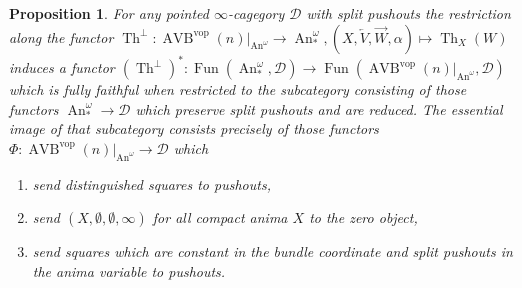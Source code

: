 \documentclass{article}
\newcommand{\cD}{\mathcal{D}}
\newcommand{\cX}{\AVB^{\vop}}
\newcommand{\vop}{\mathrm{vop}}
\DeclareMathOperator{\AVB}{AVB}
\DeclareMathOperator{\An}{An}
\DeclareMathOperator{\Fun}{Fun}
\DeclareMathOperator{\Th}{Th}
\newtheorem{proposition}{Proposition}
\begin{document}
\begin{proposition}\label{prop:dream2}
    For any pointed $\infty$-cagegory $\cD$
    with split pushouts the restriction along the functor
    $\Th^\perp \colon \cX(n)|_{\An^\omega} \to \An_*^\omega, (X,\overleftarrow{V},\overrightarrow{W}, \alpha) \mapsto \Th_X(W)$
    induces a functor
    $ (\Th^\perp)^* \colon \Fun(\An_*^\omega, \cD) \to \Fun(\cX(n)|_{\An^\omega} , \cD)$
    which is fully faithful when restricted to the subcategory consisting of those
    functors $\An_*^\omega \to \cD$ which preserve split pushouts and are reduced.
    The essential image of that subcategory consists precisely of those functors
    $\Phi \colon \cX(n)|_{\An^\omega}  \to \cD$ which
    \begin{enumerate}
      \item send distinguished squares to pushouts,
      \item send $(X,\emptyset,\emptyset, \infty)$ for all compact anima $X$ to the zero object,
      \item send squares which are constant in the bundle coordinate and split pushouts in the anima variable to pushouts.
    \end{enumerate}
\end{proposition}
\end{document}
